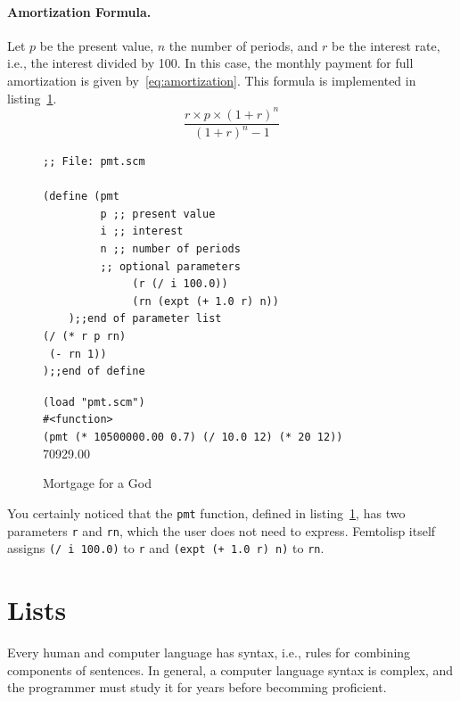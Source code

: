 \documentclass[a4paper,12pt]{book}
\newenvironment{fmpage}[1]
           {\begin{lrbox}{\fmbox}\begin{minipage}{#1}}
           {\end{minipage}\end{lrbox}\fbox{\usebox{\fmbox}}}
\begin{document}
\paragraph{Amortization Formula.} Let $p$ be the
present value, $n$ the number of periods,
and $r$ be the
interest rate, i.e., the interest divided by 100.
In this case, the monthly payment for full
amortization is given by~\ref{eq:amortization}.
This formula is implemented in
listing~\ref{Pan:mortgage}.
\begin{equation}
\frac{r\times p\times(1+r)^n}{(1+r)^n - 1}
\label{eq:amortization}
\end{equation}

\begin{figure}[!h]
\begin{fmpage}{0.9\textwidth}
\begin{verbatim}
;; File: pmt.scm

(define (pmt 
         p ;; present value
         i ;; interest 
         n ;; number of periods
         ;; optional parameters
              (r (/ i 100.0)) 
              (rn (expt (+ 1.0 r) n)) 
    );;end of parameter list
(/ (* r p rn)
 (- rn 1))
);;end of define

\end{verbatim}
\end{fmpage}

\begin{fmpage}{0.9\textwidth}
\verb|(load "pmt.scm")|\\
\verb|#<function>|\\
\verb|(pmt (* 10500000.00 0.7) (/ 10.0 12) (* 20 12))|\\
70929.00
\end{fmpage}
\caption{Mortgage for a God}
\label{Pan:mortgage}
\end{figure}

You certainly noticed that the
\verb|pmt| function, defined
in listing~\ref{Pan:mortgage},
has two parameters \verb|r| and \verb|rn|,
which the user does not need
to express. Femtolisp itself
assigns \verb|(/ i 100.0)| to \verb|r|
and \verb|(expt (+ 1.0 r) n)| to \verb|rn|.

\section{Lists}
Every human and computer language
has syntax, i.e., rules for combining
components of sentences.
In general, a computer language
syntax is complex, and the programmer
must study it for years before
becomming proficient.
\end{document}
